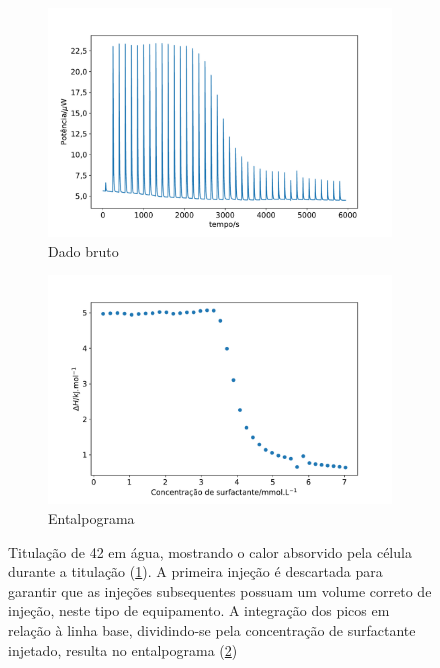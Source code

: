 		\begin{figure}[h]
			\begin{subfigure}[t]{0.5\textwidth}
				\centering
				\includegraphics[width=\textwidth]{./imagens/itc/raw_itc_exemplo}
				\caption{Dado bruto}
				\label{fig:ITC_raw_exemplo}
			\end{subfigure}%
			\begin{subfigure}[t]{0.5\textwidth}
				\centering
				\includegraphics[width=\textwidth]{./imagens/itc/inj_itc_exemplo}
				\caption{Entalpograma}
				\label{fig:ITC_inj_exemplo}
			\end{subfigure}
		
			\caption{Titulação de \TTAB{} 42 \mM{} em água, mostrando o calor absorvido pela célula durante a titulação (\ref{fig:ITC_raw_exemplo}). A primeira injeção é descartada para garantir que as injeções subsequentes possuam um volume correto de injeção, neste tipo de equipamento. A integração dos picos em relação à linha base, dividindo-se pela concentração de surfactante injetado, resulta no entalpograma (\ref{fig:ITC_inj_exemplo})}
			\label{fig:ITC_exemplo}
		\end{figure}
		
